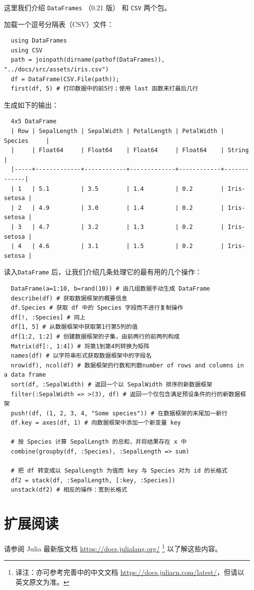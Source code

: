 \documentclass[10pt,a4paper]{article}
\begin{document}
这里我们介绍 \lstinline|DataFrames| （0.21 版） 和 \lstinline|CSV| 两个包。

加载一个逗号分隔表（CSV）文件：
\begin{lstlisting}
  using DataFrames
  using CSV
  path = joinpath(dirname(pathof(DataFrames)), "../docs/src/assets/iris.csv")
  df = DataFrame(CSV.File(path));
  first(df, 5) # 打印数据中的前5行；使用 last 函数来打最后几行
\end{lstlisting}

生成如下的输出：
\begin{lstlisting}
  4x5 DataFrame
  | Row | SepalLength | SepalWidth | PetalLength | PetalWidth | Species     |
  |     | Float64     | Float64    | Float64     | Float64    | String      |
  |-----+-------------+------------+-------------+------------+-------------|
  | 1   | 5.1         | 3.5        | 1.4         | 0.2        | Iris-setosa |
  | 2   | 4.9         | 3.0        | 1.4         | 0.2        | Iris-setosa |
  | 3   | 4.7         | 3.2        | 1.3         | 0.2        | Iris-setosa |
  | 4   | 4.6         | 3.1        | 1.5         | 0.2        | Iris-setosa |
\end{lstlisting}

读入\lstinline|DataFrame| 后，让我们介绍几条处理它的最有用的几个操作：
\begin{lstlisting}
  DataFrame(a=1:10, b=rand(10)) # 由几组数据手动生成 DataFrame
  describe(df) # 获取数据框架的概要信息
  df.Species # 获取 df 中的 Species 字段而不进行复制操作
  df[!, :Species] # 同上
  df[1, 5] # 从数据框架中获取第1行第5列的值
  df[1:2, 1:2] # 创建数据框架的子集，由前两行的前两列构成
  Matrix(df[:, 1:4]) # 将第1到第4列转换为矩阵
  names(df) # 以字符串形式获取数据框架中的字段名
  nrow(df), ncol(df) # 数据框架的行数和列数number of rows and columns in a data frame
  sort(df, :SepalWidth) # 返回一个以 SepalWidth 排序的新数据框架
  filter(:SepalWidth => >(3), df) # 返回一个仅包含满足预设条件的行的新数据框架
  push!(df, (1, 2, 3, 4, "Some species")) # 在数据框架的末尾加一新行
  df.key = axes(df, 1) # 向数据框架中添加一个新变量 key

  # 按 Species 计算 SepalLength 的总和，并将结果存在 x 中
  combine(groupby(df, :Species), :SepalLength => sum)

  # 把 df 转变成以 SepalLength 为值而 key 与 Species 对为 id 的长格式
  df2 = stack(df, :SepalLength, [:key, :Species])
  unstack(df2) # 相反的操作：宽到长格式
\end{lstlisting}


\section{扩展阅读}
\label{sec:readmore}

请参阅 Julia 最新版文档 \url{https://docs.julialang.org/} 
\footnote{译注：亦可参考完善中的中文文档 \url{https://docs.juliacn.com/latest/}，但请以英文原文为准。} 以了解这些内容。
\end{document}
